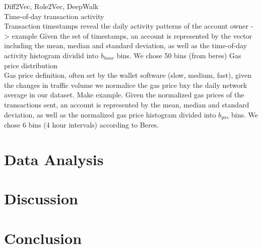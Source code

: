 \documentclass[12pt,a4paper,titlepage,oneside,english]{article}
\begin{document}
Diff2Vec, Role2Vec, DeepWalk \\
Time-of-day transaction activity \\
Transaction timestamps reveal the daily activity patterns of the account owner -> example
Given the set of timestamps, an account is represented by the vector including the mean, median and standard deviation, as well as the time-of-day activity histogram dividid into $b_{hour}$ bins. We chose 50 bins (from beres)
Gas price distribution \\
Gas price definition, often set by the wallet software (slow, medium, fast), given the changes in traffic volume we normalice the gas price bxy the daily network average in our dataset. Make example. Given the normalized gas prices of the transactions sent, an account is represented by the mean, median and standard deviation, as well as the normalized gas price histogram divided into $b_{gas}$ bins. We chose 6 bins (4 hour intervals) according to Beres.




\section{Data Analysis}





\section{Discussion}




\section{Conclusion}




\newpage
\setcounter{page}{1}
\onehalfspacing
{}



\end{document}
